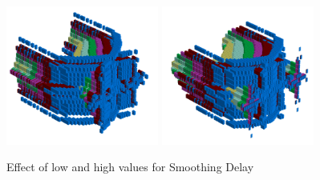 \begin{figure}[H]
    \centering
    \begin{adjustbox}{width=11cm,center}
      \includegraphics[width=5cm]{src/delay/pattern0-45.png}%
      \includegraphics[width=5cm]{src/delay/pattern1-45.png}%
    \end{adjustbox}
    \caption{Effect of low and high values for Smoothing Delay}
\end{figure}




